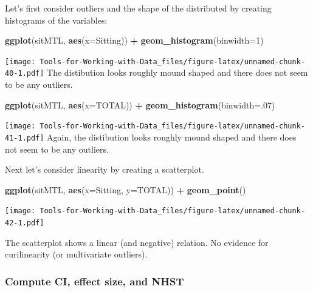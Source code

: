 \documentclass[
]{book}
\newenvironment{Shaded}{\begin{snugshade}}{\end{snugshade}}
\newcommand{\DataTypeTok}[1]{\textcolor[rgb]{0.13,0.29,0.53}{#1}}
\newcommand{\DecValTok}[1]{\textcolor[rgb]{0.00,0.00,0.81}{#1}}
\newcommand{\KeywordTok}[1]{\textcolor[rgb]{0.13,0.29,0.53}{\textbf{#1}}}
\newcommand{\NormalTok}[1]{#1}
\newcommand{\OperatorTok}[1]{\textcolor[rgb]{0.81,0.36,0.00}{\textbf{#1}}}
\newcommand{\StringTok}[1]{\textcolor[rgb]{0.31,0.60,0.02}{#1}}
\begin{document}
Let's first consider outliers and the shape of the distributed by creating histograms of the variables:

\begin{Shaded}
\begin{Highlighting}[]
\KeywordTok{ggplot}\NormalTok{(sitMTL, }\KeywordTok{aes}\NormalTok{(}\DataTypeTok{x=}\NormalTok{Sitting)) }\OperatorTok{+}
\StringTok{  }\KeywordTok{geom_histogram}\NormalTok{(}\DataTypeTok{binwidth=}\DecValTok{1}\NormalTok{)}
\end{Highlighting}
\end{Shaded}

\texttt{[image: Tools-for-Working-with-Data\_files/figure-latex/unnamed-chunk-40-1.pdf]}
The distibution looks roughly mound shaped and there does not seem to be any outliers.

\begin{Shaded}
\begin{Highlighting}[]
\KeywordTok{ggplot}\NormalTok{(sitMTL, }\KeywordTok{aes}\NormalTok{(}\DataTypeTok{x=}\NormalTok{TOTAL)) }\OperatorTok{+}
\StringTok{  }\KeywordTok{geom_histogram}\NormalTok{(}\DataTypeTok{binwidth=}\NormalTok{.}\DecValTok{07}\NormalTok{)}
\end{Highlighting}
\end{Shaded}

\texttt{[image: Tools-for-Working-with-Data\_files/figure-latex/unnamed-chunk-41-1.pdf]}
Again, the distibution looks roughly mound shaped and there does not seem to be any outliers.

Next let's consider linearity by creating a scatterplot.

\begin{Shaded}
\begin{Highlighting}[]
\KeywordTok{ggplot}\NormalTok{(sitMTL, }\KeywordTok{aes}\NormalTok{(}\DataTypeTok{x=}\NormalTok{Sitting, }\DataTypeTok{y=}\NormalTok{TOTAL)) }\OperatorTok{+}
\StringTok{  }\KeywordTok{geom_point}\NormalTok{()}
\end{Highlighting}
\end{Shaded}

\texttt{[image: Tools-for-Working-with-Data\_files/figure-latex/unnamed-chunk-42-1.pdf]}

The scatterplot shows a linear (and negative) relation. No evidence for curilinearity (or multivariate outliers).

\hypertarget{compute-ci-effect-size-and-nhst}{%
\subsubsection{Compute CI, effect size, and NHST}\label{compute-ci-effect-size-and-nhst}}
\end{document}
